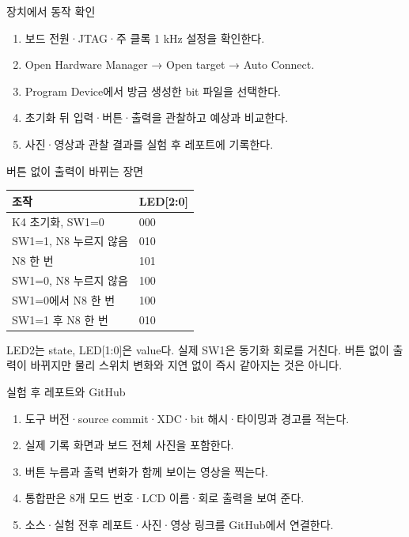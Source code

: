 \begin{frame}{장치에서 동작 확인}
\small
\begin{enumerate}
\item 보드 전원·JTAG·주 클록 1 kHz 설정을 확인한다.
\item Open Hardware Manager → Open target → Auto Connect.
\item Program Device에서 방금 생성한 bit 파일을 선택한다.
\item 초기화 뒤 입력·버튼·출력을 관찰하고 예상과 비교한다.
\item 사진·영상과 관찰 결과를 실험 후 레포트에 기록한다.
\end{enumerate}
\end{frame}

\begin{frame}{버튼 없이 출력이 바뀌는 장면}
\small
\begin{center}\renewcommand{\arraystretch}{1.55}\begin{tabular}{ll}
조작 & LED[2:0]\\\hline
K4 초기화, SW1=0 & 000\\
SW1=1, N8 누르지 않음 & 010\\
N8 한 번 & 101\\
SW1=0, N8 누르지 않음 & 100\\
SW1=0에서 N8 한 번 & 100\\
SW1=1 후 N8 한 번 & 010\\
\end{tabular}\end{center}LED2는 state, LED[1:0]은 value다. 실제 SW1은 동기화 회로를 거친다. 버튼 없이 출력이 바뀌지만 물리 스위치 변화와 지연 없이 즉시 같아지는 것은 아니다.\par
\end{frame}

\begin{frame}{실험 후 레포트와 GitHub}
\small
\begin{enumerate}
\item 도구 버전·source commit·XDC·bit 해시·타이밍과 경고를 적는다.
\item 실제 기록 화면과 보드 전체 사진을 포함한다.
\item 버튼 누름과 출력 변화가 함께 보이는 영상을 찍는다.
\item 통합판은 8개 모드 번호·LCD 이름·회로 출력을 보여 준다.
\item 소스·실험 전후 레포트·사진·영상 링크를 GitHub에서 연결한다.
\end{enumerate}
\end{frame}


